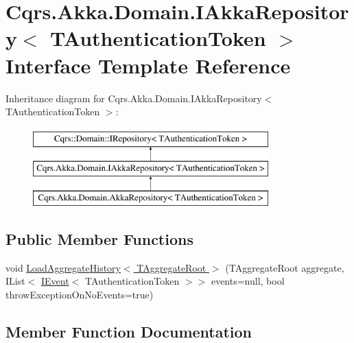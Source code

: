 \hypertarget{interfaceCqrs_1_1Akka_1_1Domain_1_1IAkkaRepository}{}\section{Cqrs.\+Akka.\+Domain.\+I\+Akka\+Repository$<$ T\+Authentication\+Token $>$ Interface Template Reference}
\label{interfaceCqrs_1_1Akka_1_1Domain_1_1IAkkaRepository}
Inheritance diagram for Cqrs.\+Akka.\+Domain.\+I\+Akka\+Repository$<$ T\+Authentication\+Token $>$\+:\begin{figure}[H]
\begin{center}
\leavevmode
\includegraphics[height=3.000000cm]{interfaceCqrs_1_1Akka_1_1Domain_1_1IAkkaRepository}
\end{center}
\end{figure}
\subsection*{Public Member Functions}
\begin{DoxyCompactItemize}
\item 
void \hyperlink{interfaceCqrs_1_1Akka_1_1Domain_1_1IAkkaRepository_a6bb695a0f1bf3860636c8d6537b3272c}{Load\+Aggregate\+History$<$ T\+Aggregate\+Root $>$} (T\+Aggregate\+Root aggregate, I\+List$<$ \hyperlink{interfaceCqrs_1_1Events_1_1IEvent}{I\+Event}$<$ T\+Authentication\+Token $>$$>$ events=null, bool throw\+Exception\+On\+No\+Events=true)
\end{DoxyCompactItemize}


\subsection{Member Function Documentation}
\mbox{\label{interfaceCqrs_1_1Akka_1_1Domain_1_1IAkkaRepository_a6bb695a0f1bf3860636c8d6537b3272c}} 
